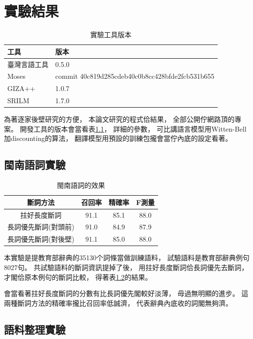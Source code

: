 \chapter{實驗結果}
\label{章：實驗結果}

\begin{table}
\caption{實驗工具版本}
\label{表：實驗工具版本}
\centering
\begin{tabular}{l|l}
工具 & 版本\\
\hline
臺灣言語工具\cite{臺灣言語工具} & 0.5.0\\
Moses\cite{Koehn:2007:MOS:1557769.1557821} & commit 40c819d285cdeb40c0b8cc428bfde2fcb531b655\\
GIZA++\cite{och2003systematic} & 1.0.7\\
SRILM\cite{stolcke2002srilm} & 1.7.0\\
\end{tabular}
\end{table}

為著逐家後壁研究的方便，
本論文研究的程式佮結果，
全部公開佇網路頂的專案\cite{翻譯研究}。
開發工具的版本會當看表\ref{表：實驗工具版本}，
詳細的參數，
可比講語言模型用Witten-Bell加discounting的算法，
翻譯模型用預設的訓練包攏會當佇內底的設定看著。
\section{閩南語詞實驗}
\label{節：閩南語詞實驗}

\begin{table}
\caption{閩南語詞的效果}
\label{表：閩南語詞的效果}
\centering
\begin{tabular}{c|ccc}
斷詞方法 & 召回率 & 精確率 & F測量\\
\hline
拄好長度斷詞 & 91.1 & 85.1 & 88.0\\
長詞優先斷詞(對頭前) & 91.0 & 84.9 & 87.9\\
長詞優先斷詞(對後壁) & 91.1 & 85.0 & 88.0\\
\end{tabular}
\end{table}

本實驗是提教育部辭典的35130个詞條當做訓練語料，
試驗語料是教育部辭典例句8027句。
共試驗語料的斷詞資訊提掉了後，
用拄好長度斷詞佮長詞優先去斷詞，
才閣佮原本例句的斷詞比較，
得著表\ref{表：閩南語詞的效果}的結果。

會當看著拄好長度斷詞的分數有比長詞優先閣較好淡薄，
毋過無明顯的進步。
這兩種斷詞方法的精確率攏比召回率低誠濟，
代表辭典內底收的詞閣無夠濟。

\section{語料整理實驗}
\label{節：語料整理實驗}

